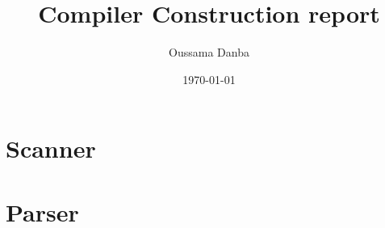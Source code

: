\documentclass{article}
\title{Compiler Construction report}
\author{Oussama Danba}
\date{\today}
\begin{document}
\maketitle

\section{Scanner}

\section{Parser}
\end{document}

